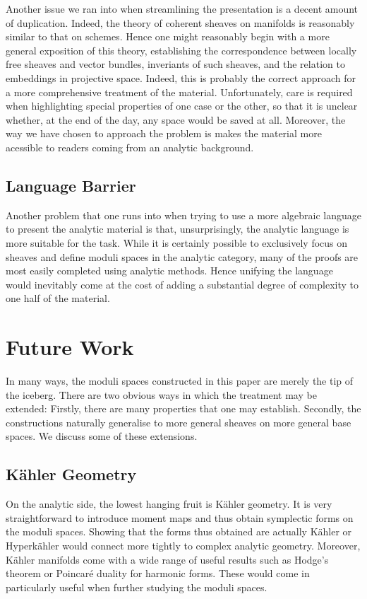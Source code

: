 \documentclass[12pt]{ociamthesis}  %
\begin{document}
Another issue we ran into when streamlining the presentation is
a decent amount of duplication. Indeed, the theory of coherent sheaves
on manifolds is reasonably similar to that on schemes. Hence
one might reasonably begin with a more general exposition of this
theory, establishing the correspondence between locally free sheaves
and vector bundles, inveriants of such sheaves, and the relation to
embeddings in projective space. Indeed, this is probably the correct
approach for a more comprehensive treatment of the material.
Unfortunately, care is required when highlighting special properties
of one case or the other, so that it is unclear whether, at the end
of the day, any space would be saved at all. Moreover, the way we
have chosen to approach the problem is makes the material more
acessible to readers coming from an analytic background.

\subsection{Language Barrier}

Another problem that one runs into when trying to use a more
algebraic language to present the analytic material is that,
unsurprisingly, the analytic language is more suitable for the
task. While it is certainly possible to exclusively focus on
sheaves and define moduli spaces in the analytic category, many
of the proofs are most easily completed using analytic methods.
Hence unifying the language would inevitably come at the cost
of adding a substantial degree of complexity to one half of the
material.

\section{Future Work}

In many ways, the moduli spaces constructed in this paper are
merely the tip of the iceberg. There are two obvious ways in which
the treatment may be extended: Firstly, there are many properties
that one may establish. Secondly, the constructions naturally generalise
to more general sheaves on more general base spaces. We discuss
some of these extensions.

\subsection{K\"ahler Geometry}

On the analytic side, the lowest hanging fruit is K\"ahler geometry.
It is very straightforward to introduce moment maps and thus obtain
symplectic forms on the moduli spaces. Showing that the forms thus
obtained are actually K\"ahler or Hyperk\"ahler would connect more
tightly to complex analytic geometry. Moreover, K\"ahler manifolds
come with a wide range of useful results such as Hodge's theorem
or Poincar\'e duality for harmonic forms. These would come in
particularly useful when further studying the moduli spaces.
\end{document}
